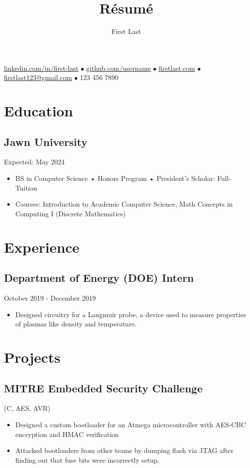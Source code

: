 \documentclass{article}
\makeatletter
\renewcommand{\maketitle}{
    \begin{center}
        {\huge\bfseries
        \theauthor}
    \end{center}
    \begin{center}
        \vspace{1em}
        \leavevmode
        \href{https://youtu.be/DLzxrzFCyOs}{linkedin.com/in/first-last} $\bullet$ \href{https://youtu.be/DLzxrzFCyOs}{github.com/username} $\bullet$ \href{https://firstlast.com}{firstlast.com} $\bullet$ \href{https://youtu.be/DLzxrzFCyOs}{firstlast123@gmail.com} $\bullet$ 123 456 7890
    \end{center}
}
\makeatother
\begin{document}
\title{R\'esum\'e}
\author{First Last}

\maketitle
\section{Education}
\subsection{Jawn University} \hfill Expected: May 2024
\begin{itemize}
    \item BS in Computer Science • Honors Program • President's Scholar: Full-Tuition
    \item Courses: Introduction to Academic Computer Science, Math Concepts in Computing I (Discrete Mathematics)
\end{itemize}

\section{Experience}
\subsection{Department of Energy (DOE) Intern}\hfill October 2019 - December 2019
\begin{itemize}
    \item Designed circuitry for a Langmuir probe, a device used to measure properties of plasmas like density and temperature.
\end{itemize}

\section{Projects}

\subsection{MITRE Embedded Security Challenge} \hfill (C, AES, AVR)
\begin{itemize}
    \item Designed a custom bootloader for an Atmega microcontroller with AES-CBC encryption and HMAC verification
    \item Attacked bootloaders from other teams by dumping flash via JTAG after finding out that fuse bits were incorrectly setup.
\end{itemize}
\end{document}
